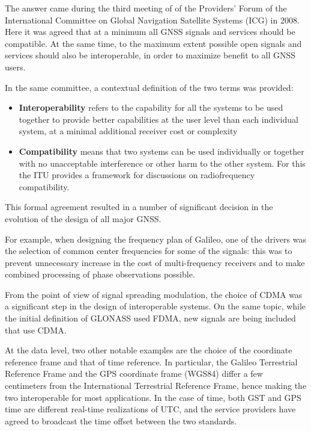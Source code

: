 The answer came during the third meeting of of the Providers' Forum of the
International Committee on Global Navigation Satellite Systems (ICG) in 2008.
Here it was agreed that at a minimum all GNSS signals and services should be
compatible. At the same time, to the maximum extent possible open signals and
services should also be interoperable, in order to maximize benefit to all GNSS
users.

In the same committee, a contextual definition of the two terms was provided:
\begin{itemize}
  \item \textbf{Interoperability} refers to the capability for all the systems
    to be used together to provide better capabilities at the user level than
    each individual system, at a minimal additional receiver cost or complexity
  \item \textbf{Compatibility} means that two systems can be used individually
    or together with no unacceptable interference or other harm to the other
    system. For this the ITU provides a framework for discussions on
    radiofrequency compatibility.
\end{itemize}

\vspace{\baselineskip}

This formal agreement resulted in a number of significant decision in the
evolution of the design of all major GNSS.

For example, when designing the frequency plan of Galileo, one of the drivers
was the selection of common center frequencies for some of the signals: this was
to prevent unnecessary increase in the cost of multi-frequency receivers and to
make combined processing of phase observations possible.

From the point of view of signal spreading modulation, the choice of CDMA was a
significant step in the design of interoperable systems. On the same topic,
while the initial definition of GLONASS used FDMA, new signals are being
included that use CDMA.

At the data level, two other notable examples are the choice of the coordinate
reference frame and that of time reference. In particular, the Galileo
Terrestrial Reference Frame and the GPS coordinate frame (WGS84) differ a few
centimeters from the International Terrestrial Reference Frame, hence making the
two interoperable for most applications. In the case of time, both GST and GPS
time are different real-time realizations of UTC, and the service providers have
agreed to broadcast the time offset between the two standards.

